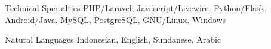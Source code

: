 


\begin{cvskills}


\cvskill
{Technical Specialties} %
{PHP/Laravel, Javascript/Livewire, Python/Flask, Android/Java, MySQL, PostgreSQL, GNU/Linux, Windows} %


\cvskill
{Natural Languages} %
{Indonesian, English, Sundanese, Arabic} %


\end{cvskills}
